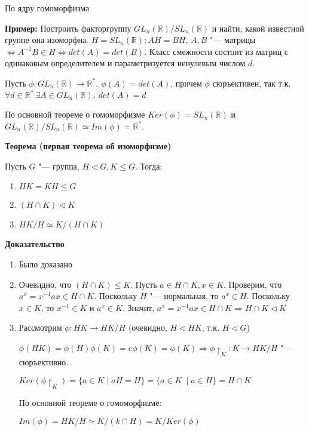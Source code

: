 \documentclass{article}
\begin{document}
По ядру гомоморфизма

\vspace{10pt}

\textbf{Пример:}
Построить факторгруппу $GL_n(\mathbb{R})/SL_n(\mathbb{R})$ и найти, какой известной группе она изоморфна. $H = SL_n(\mathbb{R}): AH = BH$, $A,B$ "--- матрицы $\Leftrightarrow A^{-1}B \in H \Leftrightarrow det(A) = det(B)$. Класс смежности состоит из матриц с одинаковым определителем и параметризуется ненулевым числом $d$.

Пусть $\phi: GL_n(\mathbb{R}) \rightarrow \mathbb{R}^*, \  \phi(A) = det(A)$, причем $\phi$ сюръективен, так т.к. $\forall d \in \mathbb{R}^* \ \exists A \in GL_n(\mathbb{R}), \  det(A) = d$

По основной теореме о гомоморфизме $Ker(\phi) = SL_n(\mathbb{R})$ и $GL_n(\mathbb{R})/SL_n(\mathbb{R}) \simeq Im(\phi) = \mathbb{R}^*$.

\vspace{10pt}

\textbf{Теорема (первая теорема об изоморфизме)}

Пусть $G$ "--- группа, $H \triangleleft G, K \leq G$. Тогда:

\begin{enumerate}
	\item $HK = KH \leq G$
	\item $(H \cap K) \triangleleft K$
	\item $HK/H \simeq K/(H \cap K)$
\end{enumerate} 

\vspace{5pt}

\textbf{Доказательство}

\begin{enumerate}
	\item Было доказано
	\item Очевидно, что $(H \cap K) \leq K$. Пусть $a \in H \cap K, x \in K$. Проверим, что $a^x = x^{-1}ax \in H \cap K$. Поскольку $H$ "--- нормальная, то $a^x \in H$. Поскольку $x \in K$, то $x^{-1} \in K$ и $a^x \in K$. Значит, $a^x = x^{-1}ax \in H \cap K \Rightarrow H \cap K \triangleleft K$ 
	\item Рассмотрим $\phi: HK \rightarrow HK/H$ (очевидно, $H \triangleleft HK$, т.к. $H \triangleleft G$)
	
	$\phi(HK) = \phi(H)\phi(K) = e\phi(K) = \phi(K) \Rightarrow \phi\!\restriction_K : K \rightarrow HK/H$ "--- сюръективно.
	
	$Ker(\phi\!\restriction_K) = \{ a \in K \mid aH = H\} = \{a \in K\ \mid a \in H\} = H \cap K$
	
	По основной теореме о гомоморфизме:
	
	$Im(\phi) = HK/H \simeq K/(k \cap H) = K/Ker(\phi)$
\end{enumerate} 
\end{document}

